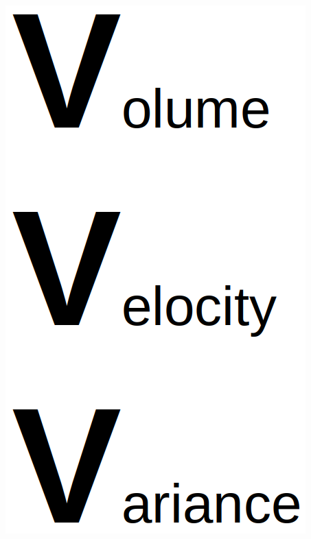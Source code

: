 \begin{frame}{}
  \begin{center}
    \includegraphics[height=0.8\textheight]{pics/vdescription}
  \end{center}
\end{frame}

